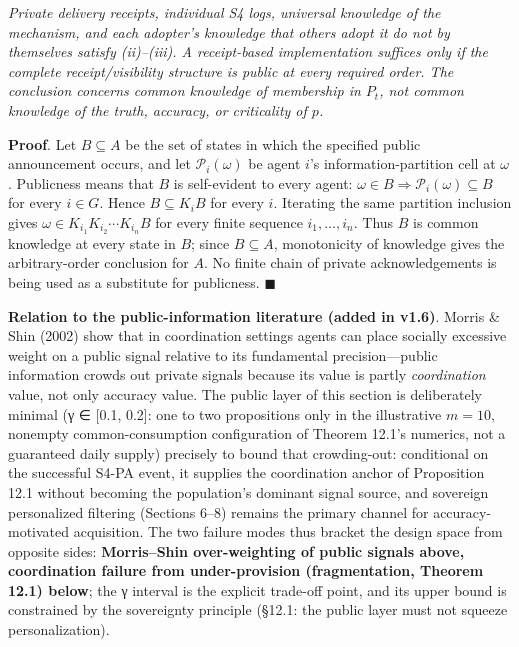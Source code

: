 \documentclass[
  11pt]{article}
\begin{document}
\emph{Private delivery receipts, individual S4 logs, universal knowledge
of the mechanism, and each adopter's knowledge that others adopt it do
not by themselves satisfy (ii)--(iii). A receipt-based implementation
suffices only if the complete receipt/visibility structure is public at
every required order. The conclusion concerns common knowledge of
membership in \(P_t\), not common knowledge of the truth, accuracy, or
criticality of \(p\).}

\textbf{Proof}. Let \(B\subseteq A\) be the set of states in which the
specified public announcement occurs, and let \(\mathcal P_i(\omega)\)
be agent \(i\)'s information-partition cell at \(\omega\). Publicness
means that \(B\) is self-evident to every agent:
\(\omega\in B\Rightarrow\mathcal P_i(\omega)\subseteq B\) for every
\(i\in G\). Hence \(B\subseteq K_iB\) for every \(i\). Iterating the
same partition inclusion gives
\(\omega\in K_{i_1}K_{i_2}\cdots K_{i_n}B\) for every finite sequence
\(i_1,\ldots,i_n\). Thus \(B\) is common knowledge at every state in
\(B\); since \(B\subseteq A\), monotonicity of knowledge gives the
arbitrary-order conclusion for \(A\). No finite chain of private
acknowledgements is being used as a substitute for publicness.
\(\blacksquare\)

\textbf{Relation to the public-information literature (added in v1.6)}.
Morris \& Shin (2002) show that in coordination settings agents can
place socially excessive weight on a public signal relative to its
fundamental precision---public information crowds out private signals
because its value is partly \emph{coordination} value, not only accuracy
value. The public layer of this section is deliberately minimal (γ ∈
{[}0.1, 0.2{]}: one to two propositions only in the illustrative
\(m=10\), nonempty common-consumption configuration of Theorem 12.1's
numerics, not a guaranteed daily supply) precisely to bound that
crowding-out: conditional on the successful S4-PA event, it supplies the
coordination anchor of Proposition 12.1 without becoming the
population's dominant signal source, and sovereign personalized
filtering (Sections 6--8) remains the primary channel for
accuracy-motivated acquisition. The two failure modes thus bracket the
design space from opposite sides: \textbf{Morris--Shin over-weighting of
public signals above, coordination failure from under-provision
(fragmentation, Theorem 12.1) below}; the γ interval is the explicit
trade-off point, and its upper bound is constrained by the sovereignty
principle (§12.1: the public layer must not squeeze personalization).
\end{document}
